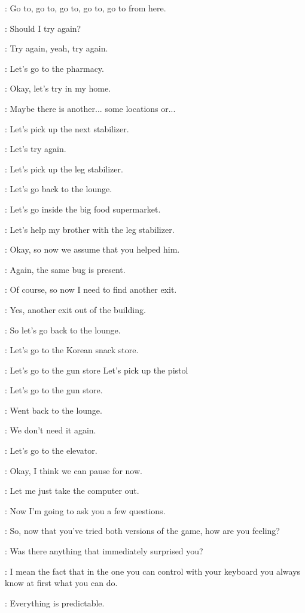 \Kacper: Go to, go to, go to, go to, go to from here.

\Kacper: Should I try again?

\Kacper: Try again, yeah, try again.

\Kacper: Let's go to the pharmacy.

\Gabriel: Okay, let's try in my home.

\Gabriel: Maybe there is another... some locations or...

\Kacper: Let's pick up the next stabilizer.

\Gabriel: Let's try again.

\Kacper: Let's pick up the leg stabilizer.

\Kacper: Let's go back to the lounge.

\Kacper: Let's go inside the big food supermarket.

\Kacper: Let's help my brother with the leg stabilizer.

\Gabriel: Okay, so now we assume that you helped him.

\Gabriel: Again, the same bug is present.

\Kacper: Of course, so now I need to find another exit.

\Gabriel: Yes, another exit out of the building.

\Kacper: So let's go back to the lounge.

\Kacper: Let's go to the Korean snack store.

\Kacper: Let's go to the gun store Let's pick up the pistol

\Kacper: Let's go to the gun store.

\Kacper: Went back to the lounge.

\Kacper: We don't need it again.

\Kacper: Let's go to the elevator.

\Gabriel: Okay, I think we can pause for now.

\Gabriel: Let me just take the computer out.

\Gabriel: Now I'm going to ask you a few questions.

\Gabriel: So, now that you've tried both versions of the game, how are you feeling?

\Gabriel: Was there anything that immediately surprised you?

\Kacper: I mean the fact that in the one you can control with your keyboard you always know at first what you can do.

\Kacper: Everything is predictable.

